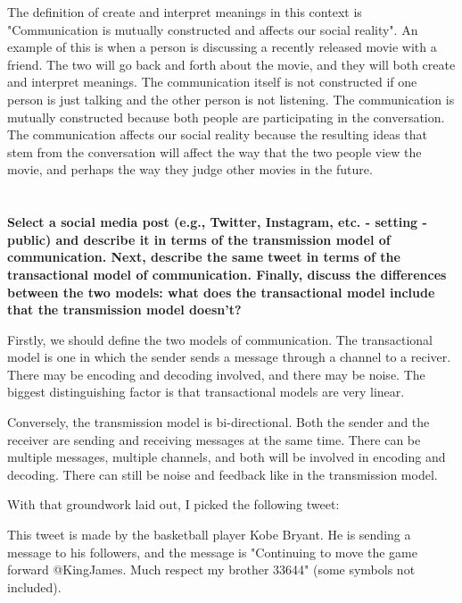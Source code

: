 \documentclass[a4paper]{article}
\begin{document}
        The definition of create and interpret meanings in this context is "Communication is mutually constructed and affects our 
        social reality". An example of this is when a person is discussing a recently released movie with a friend. The two will 
        go back and forth about the movie, and they will both create and interpret meanings. The communication itself is not 
        constructed if one person is just talking and the other person is not listening. The communication is mutually constructed
        because both people are participating in the conversation. The communication affects our social reality because the
        resulting ideas that stem from the conversation will affect the way that the two people view the movie, and 
        perhaps the way they judge other movies in the future.
  
    \section{}
        \textbf{Select a social media post (e.g., Twitter, Instagram, etc. - setting - public) and describe it in terms of the transmission model of communication. Next, describe the same tweet in terms of the transactional model of communication. Finally, discuss the differences between the two models: what does the transactional model include that the transmission model doesn’t?}

        Firstly, we should define the two models of communication. The transactional model is one in which the sender sends a message
        through a channel to a reciver. There may be encoding and decoding involved, and there may be noise. The biggest 
        distinguishing factor is that transactional models are very linear. 

        Conversely, the transmission model is bi-directional. Both the sender and the receiver are sending and receiving messages
        at the same time. There can be multiple messages, multiple channels, and both will be involved in encoding and decoding.
        There can still be noise and feedback like in the transmission model. 

        With that groundwork laid out, I picked the following tweet: \cite{kobeTweet}

        This tweet is made by the basketball player Kobe Bryant. He is sending a message to his followers, and the message is
        "Continuing to move the game forward @KingJames. Much respect my brother 33644" (some symbols not included). 
        
\end{document}
